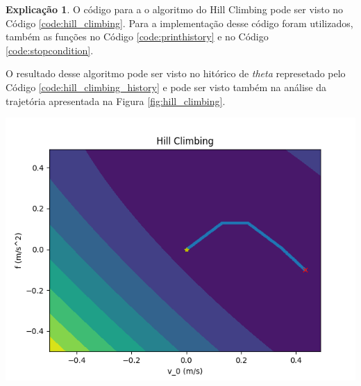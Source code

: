 \documentclass[a4paper, 9pt]{article}
\newenvironment{Figure}
  {\par\medskip\noindent\minipage{\linewidth}}
  {\endminipage\par\medskip}
\theoremstyle{plain}
\theoremstyle{definition}
\newtheorem{explanation}{Explicação}
\theoremstyle{definition}
\theoremstyle{definition}
\begin{document}
\begin{multicols}{2}
\begin{explanation}
    O código para a o algoritmo do Hill Climbing pode ser visto no Código \ref{code:hill_climbing}. Para a implementação desse código foram utilizados, também as funções no Código \ref{code:printhistory} e no Código \ref{code:stopcondition}.

    O resultado desse algoritmo pode ser visto no hitórico de \textit{theta} represetado pelo Código \ref{code:hill_climbing_history} e pode ser visto também na análise da trajetória apresentada na Figura \ref{fig:hill_climbing}.
\end{explanation}




\begin{Figure}
    \centering
    \includegraphics[width=\linewidth]
    {./../code/hill_climbing.png}
    \label{fig:hill_climbing}
\end{Figure}




\end{multicols}
\end{document}
